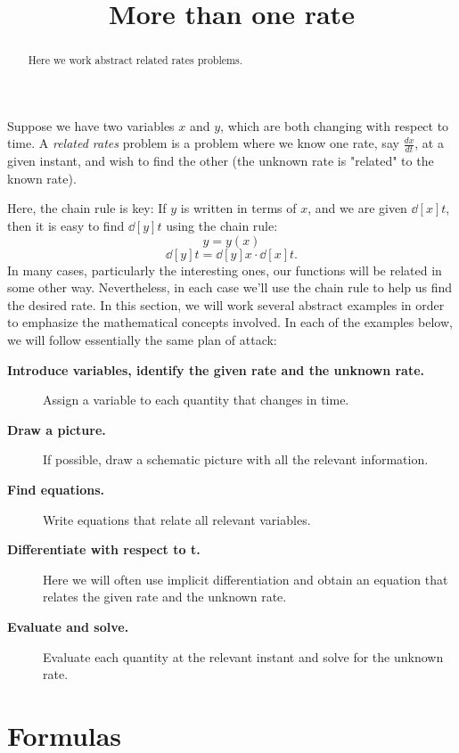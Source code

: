 \documentclass{ximera}
\title[Dig-In:]{More than one rate}
\begin{document}
\begin{abstract}
  Here we work abstract related rates problems.
\end{abstract}
\maketitle


Suppose we have two variables $x$ and $y$, which are both changing with
respect to time.  A \textit{related rates} problem is a problem where
we know one rate, say $\frac{dx}{dt}$, at a given instant, and wish to find the other (the unknown rate is "related" to the known rate).

Here, the chain rule is key: If $y$ is written in terms of $x$, and we
are given $\dd[x]{t}$, then it is easy to find $\dd[y]{t}$ using the
chain rule:
\[
y=y(x)
\]
\[
\dd[y]{t}=\dd[y]{x}\cdot \dd[x]{t}.
\]
In many cases, particularly the interesting ones, our functions will
be related in some other way. Nevertheless, in each case we'll use the
 chain rule to help us find the desired rate. In this
section, we will work several abstract examples in order to emphasize
the mathematical concepts involved. In each of the examples below, we
will follow essentially the same plan of attack:



\begin{description}
\item[\textbf{Introduce variables, identify the given rate and the unknown rate.}]
               
               Assign a variable to each quantity that changes in time.
\item[\textbf{Draw a picture.}] If possible, draw a schematic picture with all the relevant information. 
\item[\textbf{Find equations.}] Write equations that relate all
  relevant variables.
\item[\textbf{Differentiate with respect to t.}] Here we will often use
  implicit differentiation and obtain an equation that relates the given rate and the unknown rate. 
\item[\textbf{Evaluate and solve.}] Evaluate
each quantity at the relevant instant and solve for the unknown rate.

\end{description}




\section{Formulas}
\end{document}
